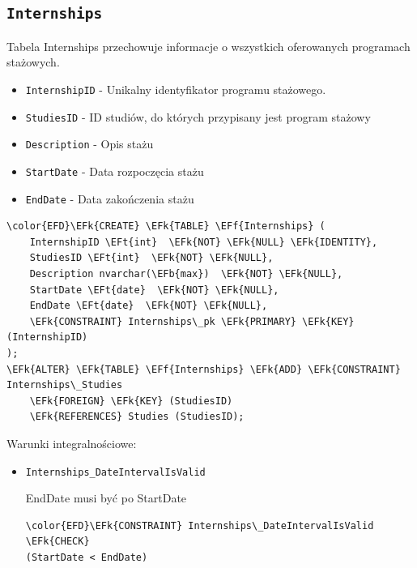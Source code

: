 \documentclass[11pt]{article}
\newcommand{\EFk}[1]{\textcolor{EFk}{\textbf{#1}}} %
\newcommand{\EFb}[1]{\textcolor{EFb}{\textbf{#1}}} %
\newcommand{\EFf}[1]{\textcolor{EFf}{#1}} %
\newcommand{\EFt}[1]{\textcolor{EFt}{\textbf{#1}}} %
\begin{document}
\subsection{\texttt{Internships}}
\label{sec:orgbedbdc1}
Tabela Internships przechowuje informacje o wszystkich oferowanych programach stażowych.
\begin{itemize}
\item \texttt{InternshipID} - Unikalny identyfikator programu stażowego.
\item \texttt{StudiesID} - ID studiów, do których przypisany jest program stażowy
\item \texttt{Description} - Opis stażu
\item \texttt{StartDate} - Data rozpoczęcia stażu
\item \texttt{EndDate} - Data zakończenia stażu
\end{itemize}
\begin{Code}
\begin{Verbatim}
\color{EFD}\EFk{CREATE} \EFk{TABLE} \EFf{Internships} (
    InternshipID \EFt{int}  \EFk{NOT} \EFk{NULL} \EFk{IDENTITY},
    StudiesID \EFt{int}  \EFk{NOT} \EFk{NULL},
    Description nvarchar(\EFb{max})  \EFk{NOT} \EFk{NULL},
    StartDate \EFt{date}  \EFk{NOT} \EFk{NULL},
    EndDate \EFt{date}  \EFk{NOT} \EFk{NULL},
    \EFk{CONSTRAINT} Internships\_pk \EFk{PRIMARY} \EFk{KEY}  (InternshipID)
);
\EFk{ALTER} \EFk{TABLE} \EFf{Internships} \EFk{ADD} \EFk{CONSTRAINT} Internships\_Studies
    \EFk{FOREIGN} \EFk{KEY} (StudiesID)
    \EFk{REFERENCES} Studies (StudiesID);
\end{Verbatim}
\end{Code}
Warunki integralnościowe:


\begin{itemize}
\item \texttt{Internships\_DateIntervalIsValid}

EndDate musi być po StartDate
\begin{Code}
\begin{Verbatim}
\color{EFD}\EFk{CONSTRAINT} Internships\_DateIntervalIsValid \EFk{CHECK}
(StartDate < EndDate)
\end{Verbatim}
\end{Code}
\end{itemize}
\end{document}
